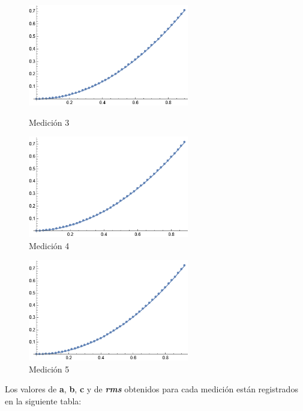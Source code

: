 \documentclass[12pt, titlepage]{report}
\begin{document}
    \begin{figure}[ht]
        \centering
        \begin{minipage}[c]{0.45\linewidth}
            \centering
            \includegraphics[width=7cm]{Graf3.png}
            \caption{Medición 3}
        \end{minipage} \hspace{.75cm}
        \begin{minipage}[c]{0.45\linewidth}
            \centering
            \includegraphics[width=7cm]{Graf4.png}
            \caption{Medición 4}
        \end{minipage}
    \end{figure}

    \begin{figure}[ht]
        \centering
        \includegraphics[width=7cm]{Graf5.png}
        \caption{Medición 5}
    \end{figure}
    
    \newpage Los valores de \textbf{a}, \textbf{b}, \textbf{c} y de \textit{\textbf{rms}} obtenidos para cada medición están registrados en la siguiente tabla:
\end{document}
